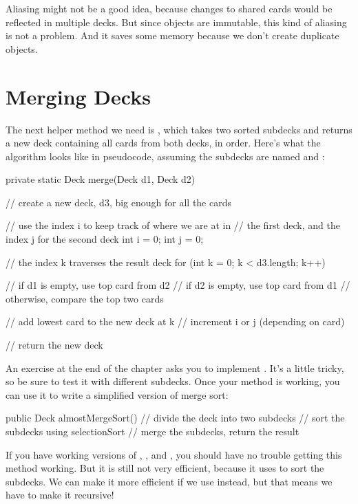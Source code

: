 
Aliasing might not be a good idea, because changes to shared cards would be reflected in multiple decks.
But since  objects are immutable, this kind of aliasing is not a problem.
And it saves some memory because we don't create duplicate  objects.


\section{Merging Decks}


The next helper method we need is , which takes two sorted subdecks and returns a new deck containing all cards from both decks, in order.
Here's what the algorithm looks like in pseudocode, assuming the subdecks are named  and :

\begin{code}
private static Deck merge(Deck d1, Deck d2) {
    // create a new deck, d3, big enough for all the cards

    // use the index i to keep track of where we are at in
    // the first deck, and the index j for the second deck
    int i = 0;
    int j = 0;

    // the index k traverses the result deck
    for (int k = 0; k < d3.length; k++) {

        // if d1 is empty, use top card from d2
        // if d2 is empty, use top card from d1
        // otherwise, compare the top two cards

        // add lowest card to the new deck at k
        // increment i or j (depending on card)
    }
    // return the new deck
}
\end{code}

An exercise at the end of the chapter asks you to implement .
It's a little tricky, so be sure to test it with different subdecks.
Once your  method is working, you can use it to write a simplified version of merge sort:

\begin{code}
public Deck almostMergeSort() {
    // divide the deck into two subdecks
    // sort the subdecks using selectionSort
    // merge the subdecks, return the result
}
\end{code}

If you have working versions of , , and , you should have no trouble getting this method working.
But it is still not very efficient, because it uses  to sort the subdecks.
We can make it more efficient if we use  instead, but that means we have to make it recursive!


